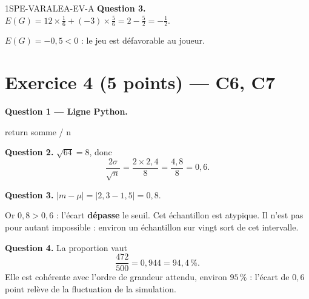 \begin{corrige}{1SPE-VARALEA-EV-A}
\medskip
\textbf{Question 3.} $E(G) = 12 \times \frac{1}{6} + (-3) \times \frac{5}{6} = 2 - \frac{5}{2} = -\frac{1}{2}$.

$E(G) = -0{,}5 < 0$ : le jeu est défavorable au joueur.

\section*{Exercice 4 \hfill (5 points) — C6, C7}


\bigskip
\textbf{Question 1 — Ligne Python.}


\begin{python}
    return somme / n
\end{python}

\medskip
\textbf{Question 2.} $\sqrt{64} = 8$, donc
\[
\frac{2\sigma}{\sqrt{n}} = \frac{2 \times 2{,}4}{8} = \frac{4{,}8}{8} = 0{,}6.
\]

\medskip
\textbf{Question 3.} $|m - \mu| = |2{,}3 - 1{,}5| = 0{,}8$.


Or $0{,}8 > 0{,}6$ : l'écart \textbf{dépasse} le seuil. Cet échantillon est
atypique. Il n'est pas pour autant impossible : environ un échantillon sur
vingt sort de cet intervalle.

\medskip
\textbf{Question 4.} La proportion vaut
\[
\frac{472}{500} = 0{,}944 = 94{,}4\,\%.
\]
Elle est cohérente avec l'ordre de grandeur attendu, environ $95\,\%$ :
l'écart de $0{,}6$ point relève de la fluctuation de la simulation.

\end{corrige}
